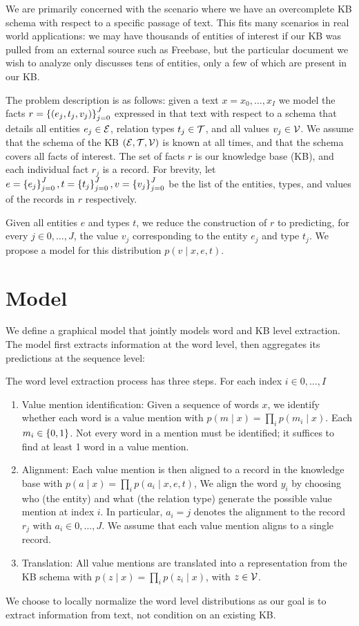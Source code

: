 \documentclass[12pt]{article}
\begin{document}
We are primarily concerned with the scenario where we have an overcomplete KB schema with
respect to a specific passage of text.
This fits many scenarios in real world applications:
we may have thousands of entities of interest if our KB was pulled from an 
external source such as Freebase,
but the particular document we wish to analyze only discusses tens of entities,
only a few of which are present in our KB.

The problem description is as follows:
given a text $x = x_0, \ldots, x_{I}$ we model the facts
$r = \left\{(e_j, t_j, v_j)\right\}_{j=0}^J$ expressed in that text
with respect to a schema that details all entities $e_j \in \mathcal{E}$,
relation types $t_j \in \mathcal{T}$, and all values $v_j \in \mathcal{V}$.
We assume that the schema of the KB $(\mathcal{E}, \mathcal{T}, \mathcal{V})$ is known at all times,
and that the schema covers all facts of interest.
The set of facts $r$ is our knowledge base (KB),
and each individual fact $r_j$ is a record.
For brevity, let $e = \left\{e_j\right\}_{j=0}^J, t = \left\{t_j\right\}_{j=0}^J, v = \left\{v_j\right\}_{j=0}^J$
be the list of the entities, types, and values of the records in $r$ respectively.

Given all entities $e$ and types $t$,
we reduce the construction of $r$ to predicting, for every $j\in 0,\ldots,J$,
the value $v_j$ corresponding to the entity $e_j$ and type $t_j$.
We propose a model for this distribution $p(v \mid x, e, t)$.

\section{Model}
We define a graphical model that jointly models 
word and KB level extraction. 
The model first extracts information at the word level,
then aggregates its predictions at the sequence level:

The word level extraction process has three steps.
For each index $i \in 0, \ldots, I$
\begin{enumerate}
\item Value mention identification: Given a sequence of words $x$,
    we identify whether each word is a value mention with
    $p(m \mid x) = \prod_i p(m_i \mid x)$.
    Each $m_i \in \left\{0,1\right\}$.
    Not every word in a mention must be identified; it suffices to find
    at least 1 word in a value mention.
\item Alignment: Each value mention is then aligned to a 
    record in the knowledge base with $p(a \mid x) = \prod_i p(a_i \mid x,e,t)$,
    We align the word $y_i$ by choosing who (the entity)
    and what (the relation type) generate the possible value mention at index $i$.
    In particular, $a_i = j$ denotes the alignment to the record $r_{j}$
    with $a_i \in 0, \ldots, J$.
    We assume that each value mention aligns to a single record.
\item Translation: All value mentions are translated
    into a representation from the KB schema with
    $p(z \mid x) = \prod_i p(z_i \mid x)$, with $z \in \mathcal{V}$.
\end{enumerate}
We choose to locally normalize the word level distributions as our goal is to
extract information from text, not condition on an existing KB.
\end{document}
